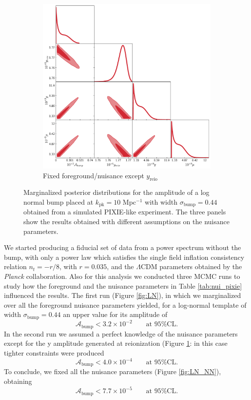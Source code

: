 \begin{figure}[ht!]
    \vspace{1em}

    \begin{subfigure}{0.5\textheight}
        \centering
        \includegraphics[width=1\textwidth]{Constraints/LN_NN_reio.pdf}
        \caption{Fixed foreground/nuisance except $y_\text{reio}$}
        \label{fig:LN_NN_reio}        
    \end{subfigure}
    \caption{Marginalized posterior distributions for the amplitude of a log normal bump placed at $k_\text{pk}=10$ Mpc$^{-1}$ with width $\sigma_\text{bump}=0.44$ obtained from a simulated PIXIE-like experiment. The three panels show the results obtained with different assumptions on the nuisance parameters.}
    \label{fig:LN_all}
\end{figure}
We started producing a fiducial set of data from a power spectrum without the bump, with only a power law which satisfies the single field inflation consistency relation $n_t=-r/8$, with $r=0.035$, and the $\Lambda$CDM parameters obtained by the \emph{Planck} collaboration. 
Also for this analysis we conducted three MCMC runs to study how the foreground and the nuisance parameters in Table \ref{tab:nui_pixie} influenced the results. 
The first run (Figure \ref{fig:LN}), in which we marginalized over all the foreground nuisance parameters yielded, for a log-normal template of width $\sigma_\text{bump}=0.44$
an upper value for its amplitude of
$$\mathcal{A}_\text{bump}<3.2\times10^{-2}\qquad\text{at 95\% CL.}$$
In the second run we assumed a perfect knowledge of the nuisance parameters except for the y amplitude generated at reionization (Figure \ref{fig:LN_NN_reio}: in this case tighter constraints were produced 
$$\mathcal{A}_\text{bump}<4.0\times10^{-4}\qquad\text{at 95\% CL.}$$
To conclude, we fixed all the nuisance parameters (Figure \ref{fig:LN_NN}), obtaining
$$\mathcal{A}_\text{bump}<7.7\times10^{-5}\qquad\text{at 95\% CL.}$$

